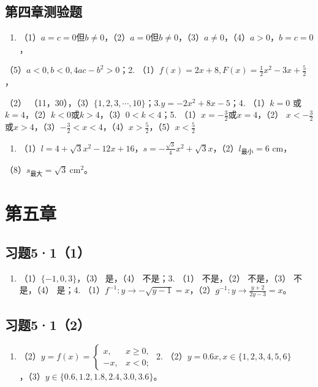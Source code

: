 \subsection{第四章测验题}

\begin{enumerate}
\item
  （1）\(a = c = 0\)但\(b \neq 0\)，（2）\(a = 0\)但\(b \neq 0\)，（3）\(a \neq 0\)，（4）\(a > 0\)，\(b = c = 0\)，
\end{enumerate}

（5）\(a < 0, b < 0, 4ac - b^2 > 0\)；2.
（1）\(f(x) = 2x + 8, F(x) = \frac{1}{2} x^2 - 3x + \frac{5}{2}\)，

（2）
（11，30），（3）\(\{1, 2, 3, \cdots, 10\}\)；3.\(y = -2x^{2} + 8x - 5\)；4.
（1）\(k = 0\)
或\(k = 4\)，（2）\(k < 0\)或\(k > 4\)，（3）\(0 < k < 4\)；5.
（1）\(x = -\frac{3}{2}\)或\(x = 4\)，（2）
\(x < -\frac{3}{2}\)或\(x > 4\)，（3）\(-\frac{3}{2} < x < 4\)，（4）\(x > \frac{5}{2}\)，（5）\(x < \frac{5}{2}\)

\begin{enumerate}[start=6]
\item
  （1）\(l = 4 + \sqrt{3} x^2 - 12x + 16\)，\(s = -\frac{\sqrt{3}}{4} x^2 + \sqrt{3} x\)，（2）\(l_{\text{最小}} = 6 \text{ cm}\)，
\end{enumerate}

（8）\(s_{\text{最大}} = \sqrt{3} \mathrm{~cm}^2\)。

\section{第五章}

\subsection{习题5·1（1）}

\begin{enumerate}[start=2]
\item
  （1）\(\{-1, 0, 3\}\)，（3） 是，（4） 不是；3. （1） 不是，（2）
  不是，（3） 不是，（4） 是；4.
  （1）\(f^{-1}: y \to -\sqrt{y - 1} = x\)，（2）\(g^{-1}: y \to \frac{y + 2}{2y - 3} = x\)。
\end{enumerate}

\subsection{习题5·1（2）}

\begin{enumerate}
\item
  （2）\(y = f(x) = \begin{cases} x, & x \geqslant 0, \\ -x, & x < 0; \end{cases}\)
  2.
  （2）\(y = 0.6x, x \in \{1, 2, 3, 4, 5, 6\}\)，（3）\(y \in \{0.6, 1.2, 1.8, 2.4, 3.0, 3.6\}\)。
\end{enumerate}

